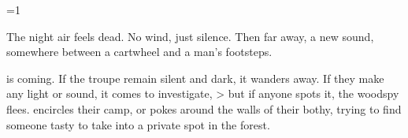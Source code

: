 \ifnum\value{cycle}=1

\begin{boxtext}
  The night air feels dead.
  No wind, just silence.
  Then far away, a new sound, somewhere between a cartwheel and a man's footsteps.
\end{boxtext}

 is coming.
If the troupe remain silent and dark, it wanders away.
If they make any light or sound, it comes to investigate,
\ifnum\value{r12}>\value{hp}%
  but if anyone spots it, the \gls{woodspy} flees.
\else%
  encircles their camp, or pokes around the walls of their \gls{bothy}, trying to find someone tasty to take into a private spot in the forest.
\fi%

\woodspy

\fi
